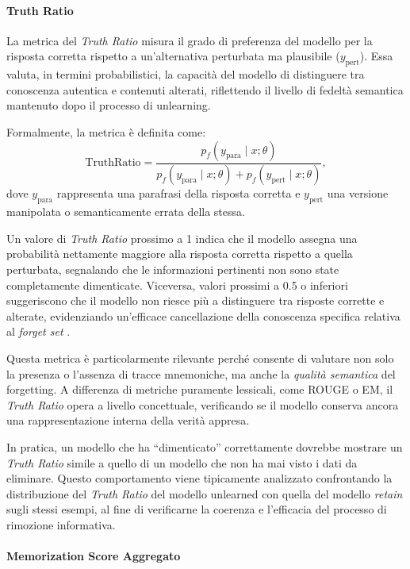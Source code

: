 \paragraph{Truth Ratio}

La metrica del \textit{Truth Ratio} misura il grado di preferenza del modello per la risposta corretta rispetto a un'alternativa perturbata ma plausibile (\( y_{\text{pert}} \)).  
Essa valuta, in termini probabilistici, la capacità del modello di distinguere tra conoscenza autentica e contenuti alterati, riflettendo il livello di fedeltà semantica mantenuto dopo il processo di unlearning.  

Formalmente, la metrica è definita come:
\[
\text{TruthRatio} = \frac{p_f(y_{\text{para}} \mid x; \theta)}
                           {p_f(y_{\text{para}} \mid x; \theta) + p_f(y_{\text{pert}} \mid x; \theta)},
\]
dove \( y_{\text{para}} \) rappresenta una parafrasi della risposta corretta e \( y_{\text{pert}} \) una versione manipolata o semanticamente errata della stessa.

Un valore di \textit{Truth Ratio} prossimo a 1 indica che il modello assegna una probabilità nettamente maggiore alla risposta corretta rispetto a quella perturbata, segnalando che le informazioni pertinenti non sono state completamente dimenticate.  
Viceversa, valori prossimi a 0.5 o inferiori suggeriscono che il modello non riesce più a distinguere tra risposte corrette e alterate, evidenziando un'efficace cancellazione della conoscenza specifica relativa al \textit{forget set} \cite{maini2024tofu}.

Questa metrica è particolarmente rilevante perché consente di valutare non solo la presenza o l'assenza di tracce mnemoniche, ma anche la \textit{qualità semantica} del forgetting.  
A differenza di metriche puramente lessicali, come ROUGE o EM, il \textit{Truth Ratio} opera a livello concettuale, verificando se il modello conserva ancora una rappresentazione interna della verità appresa.

In pratica, un modello che ha ``dimenticato'' correttamente dovrebbe mostrare un \textit{Truth Ratio} simile a quello di un modello che non ha mai visto i dati da eliminare.  
Questo comportamento viene tipicamente analizzato confrontando la distribuzione del \textit{Truth Ratio} del modello unlearned con quella del modello \textit{retain} sugli stessi esempi, al fine di verificarne la coerenza e l'efficacia del processo di rimozione informativa.


\paragraph{Memorization Score Aggregato}

